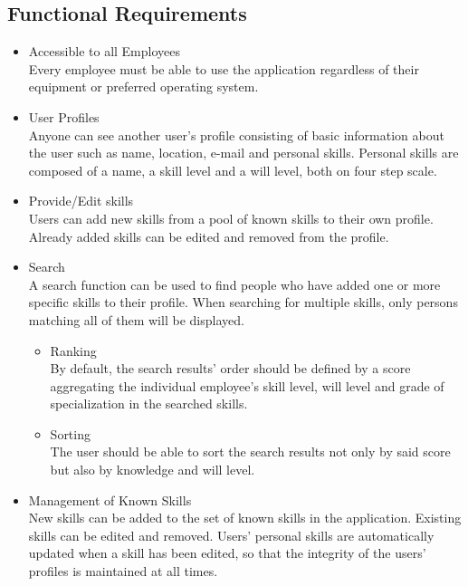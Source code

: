 \subsection{Functional Requirements}
\begin{itemize}
 	\item Accessible to all Employees\\
	Every employee must be able to use the application regardless of their equipment or preferred operating system.
	\item User Profiles \\
	Anyone can see another user’s profile consisting of basic information about the user such as name, location, e-mail and personal skills. Personal skills are composed of a name, a skill level and a will level, both on four step scale.
	\item Provide/Edit skills\\
	Users can add new skills from a pool of known skills to their own profile. Already added skills can be edited and removed from the profile.
	\item Search\\
	A search function can be used to find people who have added one or more specific skills to their profile. When searching for multiple skills, only persons matching all of them will be displayed.
	\begin{itemize}
		\item Ranking\\
			By default, the search results' order should be defined by a score aggregating the individual employee's skill level, will level and grade of specialization in the searched skills.
		\item Sorting\\
			The user should be able to sort the search results not only by said score
			but also by knowledge and will level.
	\end{itemize}
	\item Management of Known Skills\\
	New skills can be added to the set of known skills in the application. Existing skills can be edited and removed. Users' personal skills are automatically updated when a skill has been edited, so that the integrity of the users' profiles is maintained at all times.
\end{itemize}

